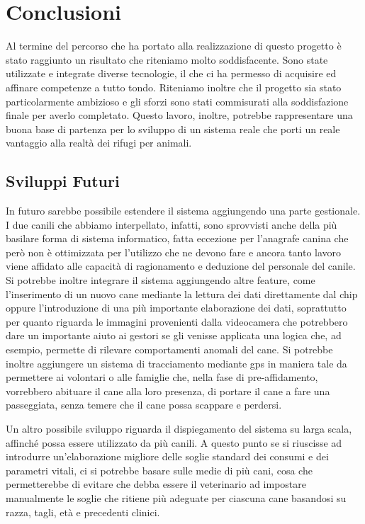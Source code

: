 

\chapter{Conclusioni}
Al termine del percorso che ha portato alla realizzazione di questo progetto è stato raggiunto un risultato che riteniamo molto soddisfacente. Sono state utilizzate e integrate diverse tecnologie, il che ci ha permesso di acquisire ed affinare competenze a tutto tondo. Riteniamo inoltre che il progetto sia stato particolarmente ambizioso e gli sforzi sono stati commisurati alla soddisfazione finale per averlo completato. Questo lavoro, inoltre, potrebbe rappresentare una buona base di partenza per lo sviluppo di un sistema reale che porti un reale vantaggio alla realtà dei rifugi per animali. 
    \section{Sviluppi Futuri}
    In futuro sarebbe possibile estendere il sistema aggiungendo una parte gestionale. I due canili che abbiamo interpellato, infatti, sono sprovvisti anche della più basilare forma di sistema informatico, fatta eccezione per l'anagrafe canina che però non è ottimizzata per l'utilizzo che ne devono fare e ancora tanto lavoro viene affidato alle capacità di ragionamento e deduzione del personale del canile. 
    Si potrebbe inoltre integrare il sistema aggiungendo altre feature, come l'inserimento di un nuovo cane mediante la lettura dei dati direttamente dal chip oppure l'introduzione di una più importante elaborazione dei dati, soprattutto per quanto riguarda le immagini provenienti dalla videocamera che potrebbero dare un importante aiuto ai gestori se gli venisse applicata una logica che, ad esempio, permette di rilevare comportamenti anomali del cane. Si potrebbe inoltre aggiungere un sistema di tracciamento mediante gps in maniera tale da permettere ai volontari o alle famiglie che, nella fase di pre-affidamento, vorrebbero abituare il cane alla loro presenza, di portare il cane a fare una passeggiata, senza temere che il cane possa scappare e perdersi.
    
    Un altro possibile sviluppo riguarda il dispiegamento del sistema su larga scala, affinché possa essere utilizzato da più canili. A questo punto se si riuscisse ad introdurre un'elaborazione migliore delle soglie standard dei consumi e dei parametri vitali, ci si potrebbe basare sulle medie di più cani, cosa che permetterebbe di evitare che debba essere il veterinario ad impostare manualmente le soglie che ritiene più adeguate per ciascuna cane basandosi su razza, tagli, età e precedenti clinici.
